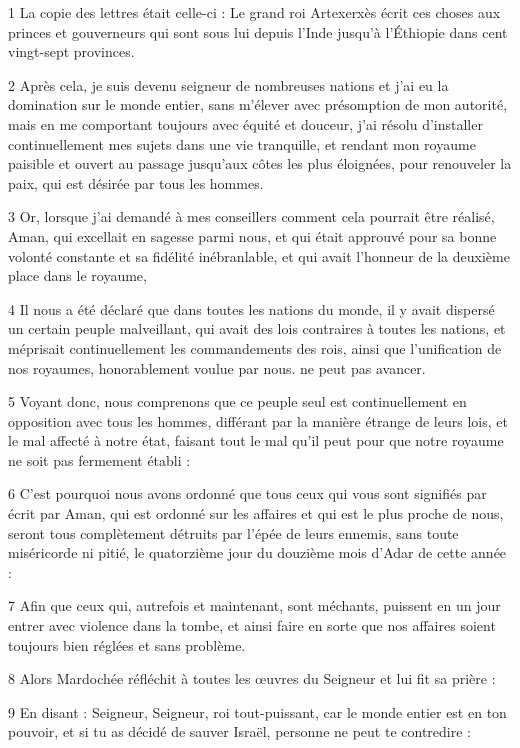 \par 1 La copie des lettres était celle-ci : Le grand roi Artexerxès écrit ces choses aux princes et gouverneurs qui sont sous lui depuis l'Inde jusqu'à l'Éthiopie dans cent vingt-sept provinces.
\par 2 Après cela, je suis devenu seigneur de nombreuses nations et j'ai eu la domination sur le monde entier, sans m'élever avec présomption de mon autorité, mais en me comportant toujours avec équité et douceur, j'ai résolu d'installer continuellement mes sujets dans une vie tranquille, et rendant mon royaume paisible et ouvert au passage jusqu'aux côtes les plus éloignées, pour renouveler la paix, qui est désirée par tous les hommes.
\par 3 Or, lorsque j'ai demandé à mes conseillers comment cela pourrait être réalisé, Aman, qui excellait en sagesse parmi nous, et qui était approuvé pour sa bonne volonté constante et sa fidélité inébranlable, et qui avait l'honneur de la deuxième place dans le royaume,
\par 4 Il nous a été déclaré que dans toutes les nations du monde, il y avait dispersé un certain peuple malveillant, qui avait des lois contraires à toutes les nations, et méprisait continuellement les commandements des rois, ainsi que l'unification de nos royaumes, honorablement voulue par nous. ne peut pas avancer.
\par 5 Voyant donc, nous comprenons que ce peuple seul est continuellement en opposition avec tous les hommes, différant par la manière étrange de leurs lois, et le mal affecté à notre état, faisant tout le mal qu'il peut pour que notre royaume ne soit pas fermement établi :
\par 6 C'est pourquoi nous avons ordonné que tous ceux qui vous sont signifiés par écrit par Aman, qui est ordonné sur les affaires et qui est le plus proche de nous, seront tous complètement détruits par l'épée de leurs ennemis, sans toute miséricorde ni pitié, le quatorzième jour du douzième mois d'Adar de cette année :
\par 7 Afin que ceux qui, autrefois et maintenant, sont méchants, puissent en un jour entrer avec violence dans la tombe, et ainsi faire en sorte que nos affaires soient toujours bien réglées et sans problème.
\par 8 Alors Mardochée réfléchit à toutes les œuvres du Seigneur et lui fit sa prière :
\par 9 En disant : Seigneur, Seigneur, roi tout-puissant, car le monde entier est en ton pouvoir, et si tu as décidé de sauver Israël, personne ne peut te contredire :
